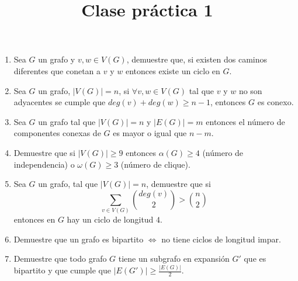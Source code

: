 \documentclass{article}
\begin{document}
\title{Clase pr\'actica 1}
\maketitle

\begin{enumerate}
    \item Sea $G$ un grafo y $v, w \in V(G)$, demuestre que, si existen dos caminos diferentes que conetan a $v$ y $w$ entonces existe un ciclo en $G$.
    \item Sea $G$ un grafo,  $|V(G)| = n$, si $\forall v,w \in V(G)$ tal que $v$ y $w$ no son adyacentes se cumple que $deg(v) + deg(w) \geq n-1$, entonces $G$ es conexo.
    \item Sea $G$ un grafo tal que $|V(G)| = n$ y $|E(G)|=m$ entonces el n\'umero de componentes conexas de $G$ es mayor o igual que $n-m$.
    \item Demuestre que si $|V(G)| \geq 9$ entonces $\alpha(G)\geq 4$ (n\'umero de independencia) o $\omega(G) \geq 3$ (n\'umero de clique).
    \item Sea $G$ un grafo, tal que $|V(G)| = n$, demuestre que si $$\sum_{v \in V(G)} \binom{deg(v)}{2} > \binom{n}{2}$$ entonces en $G$ hay un ciclo de longitud $4$.
    \item Demuestre que un grafo es bipartito $ \Leftrightarrow $ no tiene ciclos de longitud impar.
    \item Demuestre que todo grafo $G$ tiene un subgrafo en expansi\'on  $G'$ que es bipartito y que cumple que $|E(G')| \geq \frac{|E(G)|}{2}$.
  \end{enumerate}
\end{document}
